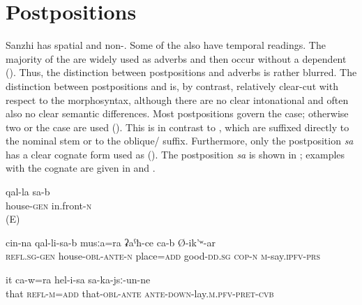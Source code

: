 \chapter{Postpositions}
\label{cpt:postpositions}

Sanzhi has spatial and non-. Some of the  also have temporal readings. The majority of the  are widely used as adverbs and then occur without a dependent  (). Thus, the distinction between postpositions and adverbs is rather blurred. The distinction between postpositions and  is, by contrast, relatively clear-cut with respect to the morphosyntax, although there are no clear intonational and often also no clear semantic differences. Most postpositions govern the  case; otherwise two  or the  case are used (). This is in contrast to , which are suffixed directly to the nominal stem or to the oblique/ suffix. Furthermore, only the postposition \textit{sa} has a clear cognate form used as  (). The postposition \textit{sa} is shown in ; examples with the cognate  are given in  and . 
%
\begin{exe}
	\ex	
	\begin{xlist}
			\ex	\label{in front of the house}
		\gll	qal-la	sa-b \\
			house-\textsc{gen}	in.front-\textsc{n}\\
		\glt	{} (E)
		
		\ex	\label{In front of his house there is also a good area, he says}
		\gll	cin-na	qal-li-sa-b	musːa=ra	ʡaˁħ-ce	ca-b Ø-ik'ʷ-ar\\
			\textsc{refl}.\textsc{sg}-\textsc{gen}	house-\textsc{obl}-\textsc{ante}-\textsc{n}	place=\textsc{add} good-\textsc{dd}.\textsc{sg} \textsc{cop-n}	\textsc{m}-say.\textsc{ipfv}-\textsc{prs}\\
		\glt	{}

		\ex	\label{he himself also slept in front of it}
		\gll	it	ca-w=ra	hel-i-sa	sa-ka-jsː-un-ne\\
			that	\textsc{refl}-\textsc{m}=\textsc{add}	that-\textsc{obl}-\textsc{ante}	\textsc{ante-down}-lay.\textsc{m}.\textsc{pfv}-\textsc{pret}-\textsc{cvb}\\
		\glt	{}
	\end{xlist}
\end{exe}

